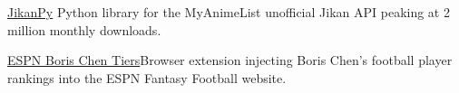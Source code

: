 

\begin{cvskills}

    \cvskill
    {\href{https://pypi.org/project/jikanpy/}{JikanPy}}
    {Python library for the MyAnimeList unofficial Jikan API peaking at 2 million monthly downloads.} %

    \cvskill
    {\href{https://chromewebstore.google.com/detail/espn-boris-chen-tiers/jeepoadedgacclojbfelfglcpldddbpk}
    {ESPN Boris Chen Tiers}}{Browser extension injecting Boris Chen's football player rankings into the ESPN Fantasy Football website.}

\end{cvskills}
